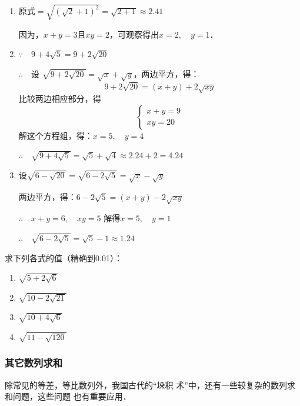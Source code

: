 \begin{solution}
\begin{enumerate}
    \item $\text{原式}=\sqrt{(\sqrt{2}+1)^2}=\sqrt{2+1}\approx 2.41$
    
因为，$x+y=3$且$xy=2$，可观察得出$x=2,\quad y=1$．
\item $\because\quad 9+4\sqrt{5}=9+2\sqrt{20}$

$\therefore\quad $设 $\sqrt{9+2\sqrt{20}}=\sqrt{x}+\sqrt{y}$，两边平方，得：
\[9+2\sqrt{20}=(x+y)+2\sqrt{xy}\]
比较两边相应部分，得
\[\begin{cases}
    x+y=9\\
xy=20
\end{cases}\]
解这个方程组，得：$x=5,\quad y=4$

$\therefore\quad \sqrt{9+4\sqrt{5}}=\sqrt{5}+\sqrt{4}\approx 2.24+2=4.24$

\item 设$\sqrt{6-\sqrt{20}}=\sqrt{6-2\sqrt{5}}=\sqrt{x}-\sqrt{y}$

两边平方，得：$6-2\sqrt{5}=(x+y)-2\sqrt{xy}$

$\therefore\quad x+y=6,\quad xy=5$
解得$x=5,\quad y=1$

$\therefore\quad \sqrt{6-2\sqrt{5}}=\sqrt{5}-1\approx 1.24$

\end{enumerate}
\end{solution}

\begin{ex}
    求下列各式的值（精确到0.01）：
\begin{multicols}{2}
    \begin{enumerate}
        \item $\sqrt{5+2\sqrt{6}}$
        \item $\sqrt{10-2\sqrt{21}}$
        \item $\sqrt{10+4\sqrt{6}}$
        \item $\sqrt{11-\sqrt{120}}$
    \end{enumerate}
\end{multicols}
\end{ex}






\subsubsection{其它数列求和}
除常见的等差，等比数列外，我国古代的“垛积
术”中，还有一些较复杂的数列求和问题，这些问题
也有重要应用．


